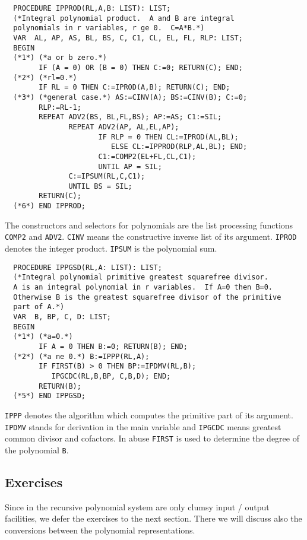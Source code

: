 {\footnotesize
\begin{verbatim}
  PROCEDURE IPPROD(RL,A,B: LIST): LIST;
  (*Integral polynomial product.  A and B are integral 
  polynomials in r variables, r ge 0.  C=A*B.*)
  VAR  AL, AP, AS, BL, BS, C, C1, CL, EL, FL, RLP: LIST;
  BEGIN
  (*1*) (*a or b zero.*)
        IF (A = 0) OR (B = 0) THEN C:=0; RETURN(C); END;
  (*2*) (*rl=0.*)
        IF RL = 0 THEN C:=IPROD(A,B); RETURN(C); END;
  (*3*) (*general case.*) AS:=CINV(A); BS:=CINV(B); C:=0; 
        RLP:=RL-1;
        REPEAT ADV2(BS, BL,FL,BS); AP:=AS; C1:=SIL;
               REPEAT ADV2(AP, AL,EL,AP);
                      IF RLP = 0 THEN CL:=IPROD(AL,BL); 
                         ELSE CL:=IPPROD(RLP,AL,BL); END;
                      C1:=COMP2(EL+FL,CL,C1);
                      UNTIL AP = SIL;
               C:=IPSUM(RL,C,C1);
               UNTIL BS = SIL;
        RETURN(C);
  (*6*) END IPPROD;
\end{verbatim}
}
The constructors and selectors for polynomials 
are the list processing functions \verb/COMP2/ and 
\verb/ADV2/. 
\verb/CINV/ means the constructive inverse list 
of its argument.
\verb/IPROD/ denotes the integer product.
\verb/IPSUM/ is the polynomial sum.


{\footnotesize
\begin{verbatim}
  PROCEDURE IPPGSD(RL,A: LIST): LIST; 
  (*Integral polynomial primitive greatest squarefree divisor.  
  A is an integral polynomial in r variables.  If A=0 then B=0.  
  Otherwise B is the greatest squarefree divisor of the primitive 
  part of A.*)
  VAR  B, BP, C, D: LIST; 
  BEGIN
  (*1*) (*a=0.*) 
        IF A = 0 THEN B:=0; RETURN(B); END; 
  (*2*) (*a ne 0.*) B:=IPPP(RL,A); 
        IF FIRST(B) > 0 THEN BP:=IPDMV(RL,B); 
           IPGCDC(RL,B,BP, C,B,D); END; 
        RETURN(B); 
  (*5*) END IPPGSD; 
\end{verbatim}
}
\verb/IPPP/ denotes the algorithm which computes 
the primitive part of its argument.
\verb/IPDMV/ stands for derivation in the main variable
and \verb/IPGCDC/ means greatest common divisor and
cofactors. 
In abuse \verb/FIRST/ is used to determine the 
degree of the polynomial \verb/B/.


\subsection{Exercises} %

Since in the recursive polynomial system are only clumsy 
input / output facilities, we defer the exercises 
to the next section. There we will discuss also the 
conversions between the polynomial representations. 



